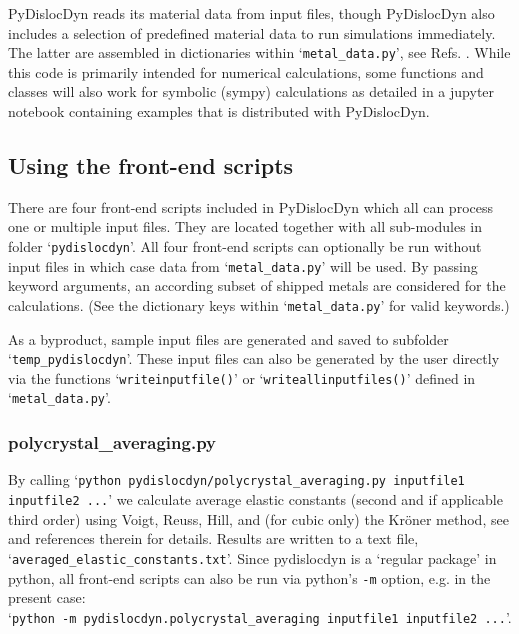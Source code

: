 \documentclass[11pt,letterpaper,oneside]{article}
\begin{document}
PyDislocDyn reads its material data from input files, though PyDislocDyn also includes a selection of predefined material data to run simulations immediately.
The latter are assembled in dictionaries within `\verb|metal_data.py|', see Refs. \cite{Hertzberg:2012,Kaye:2004,CRCHandbook,Wasserbaech:1990,Seeger:1960,Graham:1968,Smith:1966,Kiewel:1996,Samsonov:1968,Epstein:1965,Lowrie:1967,Thomas:1968,Hiki:1966,Leese:1968,Voronov:1978,Alers:1960,Saunders:1986,Powell:1984,Naimon:1971,Riley:1973,Swartz:1972,Rao:1973,Swartz:1970,Singh:1992,Barrera:1993,Jiles:1981,Yogurtcu:1985,Srinivasan:1973a,Rao:1980,Krasilnikov:2012,Vekilov:2016,Suzuki:1971,Cai:2020,Duzgun:1993,Blind:1979}.
While this code is primarily intended for numerical calculations, some functions and classes will also work for symbolic (sympy) calculations as detailed in a jupyter notebook containing examples that is distributed with PyDislocDyn.

\subsection{Using the front-end scripts}
\label{sec:frontends}

There are four front-end scripts included in PyDislocDyn which all can process one or multiple input files.
They are located together with all sub-modules in folder `\verb|pydislocdyn|'.
All four front-end scripts can optionally be run without input files in which case data from `\verb|metal_data.py|' will be used.
By passing keyword arguments, an according subset of shipped metals are considered for the calculations.
(See the dictionary keys within `\verb|metal_data.py|' for valid keywords.)

As a byproduct, sample input files are generated and saved to subfolder `\verb|temp_pydislocdyn|'.
These input files can also be generated by the user directly via the functions `\verb|writeinputfile()|' or `\verb|writeallinputfiles()|' defined in `\verb|metal_data.py|'.


\subsubsection{polycrystal\_averaging.py}

By calling `\verb|python pydislocdyn/polycrystal_averaging.py inputfile1 inputfile2 ...|' we calculate average elastic constants (second and if applicable third order) using Voigt, Reuss, Hill, and (for cubic only) the Kr{\"o}ner method, see \cite{Blaschke:2017Poly} and references therein for details.
Results are written to a text file,
`\verb|averaged_elastic_constants.txt|'.
Since pydislocdyn is a `regular package' in python, all front-end scripts can also be run via python's \verb|-m| option, e.g. in the present case:\\
`\verb|python -m pydislocdyn.polycrystal_averaging inputfile1 inputfile2 ...|'.
\end{document}

